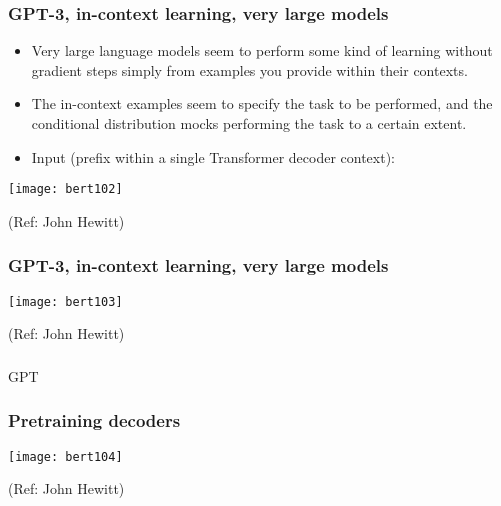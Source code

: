 \begin{frame}[fragile]\frametitle{GPT-3, in-context learning, very large models}


      \begin{itemize}
			\item Very large language models seem to perform some kind of learning without gradient  steps simply from examples you provide within their contexts.
			\item The in-context examples seem to specify the task to be performed, and the conditional  distribution mocks performing the task to a certain extent.
			\item Input (prefix within a single Transformer decoder context):
			\end{itemize}

			\begin{center}
			\texttt{[image: bert102]}
			\end{center}		
			
			{\tiny (Ref: John Hewitt)}

\end{frame}

\begin{frame}[fragile]\frametitle{GPT-3, in-context learning, very large models}


			\begin{center}
			\texttt{[image: bert103]}
			\end{center}		
			
			{\tiny (Ref: John Hewitt)}

\end{frame}

\begin{frame}[fragile]\frametitle{}
\begin{center}
{\Large GPT}
\end{center}
\end{frame}

\begin{frame}[fragile]\frametitle{Pretraining decoders}


			\begin{center}
			\texttt{[image: bert104]}
			\end{center}		
			
			{\tiny (Ref: John Hewitt)}

\end{frame}

